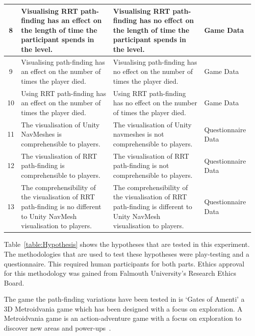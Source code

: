 \documentclass[journal]{IEEEtran}
\begin{document}
\begin{table}[h]
\begin{tabular}{|c|p{7cm}|p{7cm}|p{1.75cm}|}
			8 & Visualising RRT path-finding has an effect on the length of time the participant spends in the level. 
			& Visualising RRT path-finding has no effect on the length of time the participant spends in the level.
			& Game Data \\ \hline
						
			9 & Visualising path-finding has an effect on the number of times the player died. 
			& Visualising path-finding has no effect on the number of times the player died.  
			& Game Data \\ \hline
			
			10 & Using RRT path-finding has an effect on the number of times the player died. 
			& Using RRT path-finding has no effect on the number of times the player died.  
			& Game Data \\ \hline
			
			
			11 &   The visualisation of  Unity NavMeshes is comprehensible to players.
			&  The visualisation of  Unity navmeshes is not comprehensible to players.
				& Questionnaire Data \\ \hline
			
			12 &  The visualisation of  RRT path-finding is comprehensible to players.
			&  The visualisation of  RRT path-finding is not comprehensible to players.
			& Questionnaire Data \\ \hline
			
			13 &  The comprehensibility of the visualisation of RRT path-finding is no different to Unity NavMesh visualisation to players.
			&  The comprehensibility of the visualisation of RRT path-finding is different to Unity NavMesh visualisation to players.
			& Questionnaire Data \\ \hline
		\end{tabular}
	\end{table}
	Table~\ref{table:Hypothesis} shows the hypotheses that are tested in this experiment. The methodologies that are used to test these hypotheses were play-testing and a questionnaire. This required human participants for both parts. Ethics approval for this methodology was gained from Falmouth University’s Research Ethics Board.
	
	The game the path-finding variations have been tested in is `Gates of Amenti' a 3D Metroidvania game which has been designed with a focus on exploration. A Metroidvania game is an action-adventure game with a focus on exploration to discover new areas and power-ups~\cite{online:metroidvania}.
	
\end{document}
